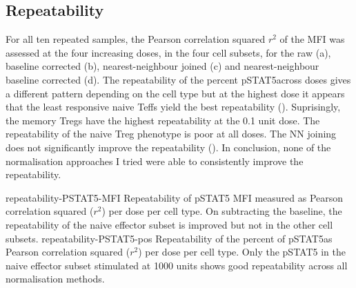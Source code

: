%
\clearpage



\subsection{Repeatability} 
For all ten repeated samples, the Pearson correlation squared $r^2$ of the MFI was assessed at the four increasing doses, in the four cell subsets,
for the raw (a),
baseline corrected (b),
nearest-neighbour joined (c)
and nearest-neighbour baseline corrected (d).
The repeatability of the percent pSTAT5\positive across doses gives a different pattern depending on the cell type
but at the highest dose it appears that the least responsive naive \glspl{Teff} yield the best
repeatability ().
Suprisingly, the memory Tregs have the highest repeatability at the 0.1 unit dose.
The repeatability of the naive \gls{Treg} phenotype is poor at all doses.  
The NN joining does not significantly improve the repeatability ().
In conclusion, none of the normalisation approaches I tried were able to consistently improve the repeatability.

{repeatability-PSTAT5-MFI}
{
  Repeatability of pSTAT5 MFI measured as Pearson correlation squared ($r^2$) per dose per cell type.
}
{
  On subtracting the baseline, the repeatability of the naive effector subset is improved but not in the other cell subsets.
} 
{repeatability-PSTAT5-pos}
{
  Repeatability of the percent of pSTAT5\positive as Pearson correlation squared ($r^2$) per dose per cell type.
}
{
  Only the pSTAT5 in the naive effector subset stimulated at 1000 units shows good repeatability across all normalisation methods.
}


